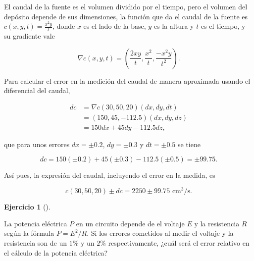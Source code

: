 \documentclass[
  spanish,
  a4paper,
]{scrreport}
\theoremstyle{definition}
\newtheorem{exercise}{Ejercicio}[chapter]
\theoremstyle{remark}
\begin{document}
\begin{tcolorbox}[enhanced jigsaw, arc=.35mm, bottomrule=.15mm, bottomtitle=1mm, breakable, colback=white, colbacktitle=quarto-callout-tip-color!10!white, colframe=quarto-callout-tip-color-frame, coltitle=black, left=2mm, leftrule=.75mm, opacityback=0, opacitybacktitle=0.6, rightrule=.15mm, title=\textcolor{quarto-callout-tip-color}{\faLightbulb}\hspace{0.5em}{Solución}, titlerule=0mm, toprule=.15mm, toptitle=1mm]

El caudal de la fuente es el volumen dividido por el tiempo, pero el
volumen del depósito depende de sus dimensiones, la función que da el
caudal de la fuente es \(c(x,y,t) = \frac{x^2y}{t}\), donde \(x\) es el
lado de la base, \(y\) es la altura y \(t\) es el tiempo, y su gradiente
vale

\[
\nabla c(x,y,t)
= \left(\frac{2xy}{t}, \frac{x^2}{t}, \frac{-x^2y}{t^2}\right).
\]

Para calcular el error en la medición del caudal de manera aproximada
usando el diferencial del caudal,

\begin{align*}
dc 
&= \nabla c(30, 50, 20)(dx, dy, dt) \\
&= (150, 45, -112.5)(dx, dy, dz) \\
&= 150dx+45dy-112.5dz,
\end{align*}

que para unos errores \(dx=\pm 0.2\), \(dy=\pm 0.3\) y \(dt=\pm 0.5\) se
tiene

\[
dc = 150(\pm 0.2) + 45(\pm 0.3) - 112.5(\pm 0.5) = \pm 99.75.
\]

Así pues, la expresión del caudal, incluyendo el error en la medida, es

\[
c(30,50,20) \pm dc = 2250 \pm 99.75 \mbox{ cm$^3$/s}.
\]

\end{tcolorbox}

\begin{exercise}[]\protect\hypertarget{exr-transmision-errores-potencial-electrico}{}\label{exr-transmision-errores-potencial-electrico}

La potencia eléctrica \(P\) en un circuito depende de el voltaje \(E\) y
la resistencia \(R\) según la fórmula \(P = E^2/R\). Si los errores
cometidos al medir el voltaje y la resistencia son de un \(1\)\% y un
\(2\)\% respectivamente, ¿cuál será el error relativo en el cálculo de
la potencia eléctrica?

\end{exercise}
\end{document}
